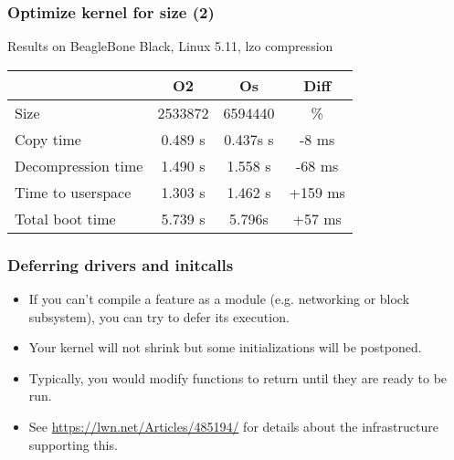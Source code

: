 \begin{frame}
\frametitle{Optimize kernel for size (2)}
Results on BeagleBone Black, Linux 5.11, lzo compression
\begin{tabular}{| l || c | c | c |}
\hline
& O2 & Os & Diff \\
\hline
Size & 2533872 & 6594440 &  \% \\
Copy time &  0.489 s & 0.437s s & -8 ms \\
Decompression time & 1.490 s & 1.558 s & -68 ms \\
Time to userspace & 1.303 s & 1.462 s & +159 ms \\
Total boot time & 5.739 s & 5.796s & +57 ms \\
\hline
\end{tabular}
\newline\newline
\end{frame}

\begin{frame}
\frametitle{Deferring drivers and initcalls}
\begin{itemize}
\item If you can't compile a feature as a module (e.g. networking or block
      subsystem), you can try to defer its execution.
\item Your kernel will not shrink but some initializations will be
      postponed.
\item Typically, you would modify  functions to return
      \code{-} until they are ready to be run.
\item See \url{https://lwn.net/Articles/485194/} for details about the
      infrastructure supporting this.
\end{itemize}
\end{frame}

